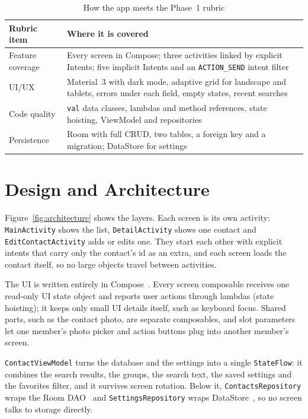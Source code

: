 \documentclass[sigconf,nonacm]{acmart}
\begin{document}
\begin{table}[t]
  \caption{How the app meets the Phase~1 rubric}
  \label{tab:rubric}
  \small
  \begin{tabular}{@{}p{}p{}@{}}
    \toprule
    Rubric item & Where it is covered \\
    \midrule
    Feature coverage & Every screen in Compose; three activities linked by explicit Intents;
      five implicit Intents and an \texttt{ACTION\_SEND} intent filter \\
    UI/UX & Material~3 with dark mode, adaptive grid for landscape and tablets, errors under each
      field, empty states, recent searches \\
    Code quality & \texttt{val} data classes, lambdas and method references, state hoisting,
      ViewModel and repositories \\
    Persistence & Room with full CRUD, two tables, a foreign key and a migration; DataStore for
      settings \\
    \bottomrule
  \end{tabular}
\end{table}

\section{Design and Architecture}
Figure~\ref{fig:architecture} shows the layers. Each screen is its own activity:
\texttt{MainActivity} shows the list, \texttt{DetailActivity} shows one contact and
\texttt{EditContactActivity} adds or edits one. They start each other with explicit intents that
carry only the contact's id as an extra, and each screen loads the contact itself, so no large
objects travel between activities.

The UI is written entirely in Compose~\cite{compose}. Every screen composable receives one
read-only UI state object and reports user actions through lambdas (state hoisting); it keeps
only small UI details itself, such as keyboard focus. Shared parts, such as the contact photo, are separate composables, and slot parameters
let one member's photo picker and action buttons plug into another member's screen.

\texttt{ContactViewModel} turns the database and the settings into a single \texttt{StateFlow}:
it combines the search results, the groups, the search text, the saved settings and the favorites
filter, and it survives screen rotation. Below it, \texttt{ContactsRepository} wraps the Room
DAO~\cite{room} and \texttt{SettingsRepository} wraps DataStore~\cite{datastore}, so no screen
talks to storage directly.
\end{document}

